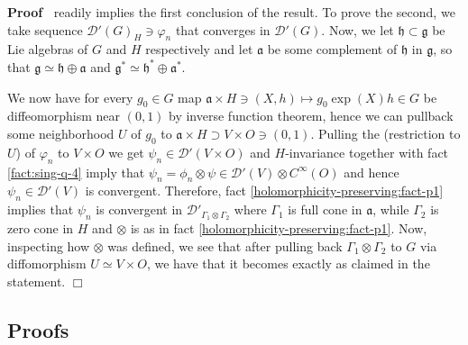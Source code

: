 \documentclass{article}
\newenvironment{proof}{\noindent\textbf{Proof\ }}{\hspace*{\fill}$\Box$\medskip}
\begin{document}
\begin{proof}
  {\cite[thm. 8.3.1]{hormander1983analysis}} readily implies the first
  conclusion of the result. To prove the second, we take sequence
  $\mathcal{D}' (G)_H \ni \varphi_n$ that converges in $\mathcal{D}' (G)$.
  Now, we let $\mathfrak{h} \subset \mathfrak{g}$ be Lie algebras of $G$ and
  $H$ respectively and let $\mathfrak{a}$ be some complement of $\mathfrak{h}$
  in $\mathfrak{g}$, so that $\mathfrak{g} \simeq \mathfrak{h} \oplus
  \mathfrak{a}$ and $\mathfrak{g}^{\ast} \simeq \mathfrak{h}^{\ast} \oplus
  \mathfrak{a}^{\ast}$.
  
  We now have for every $g_0 \in G$ map $\mathfrak{a} \times H \ni (X, h)
  \mapsto g_0 \exp (X) h \in G$ be diffeomorphism near $(0, 1)$ by inverse
  function theorem, hence we can pullback some neighborhood $U$ of $g_0$ to
  $\mathfrak{a} \times H \supset V \times O \ni (0, 1)$. Pulling the
  (restriction to $U$) of $\varphi_n$ to $V \times O$ we get $\psi_n \in
  \mathcal{D}' (V \times O)$ and $H$-invariance together with fact
  \ref{fact:sing-q-4} imply that $\psi_n = \phi_n \otimes \psi \in
  \mathcal{D}' (V) \otimes C^{\infty} (O)$ and hence $\psi_n \in \mathcal{D}'
  (V)$ is convergent. Therefore, fact \ref{holomorphicity-preserving:fact-p1}
  implies that $\psi_n$ is convergent in $\mathcal{D}'_{\Gamma_1 \otimes
  \Gamma_2}$ where $\Gamma_1$ is full cone in $\mathfrak{a}$, while $\Gamma_2$
  is zero cone in $H$ and $\otimes$ is as in fact
  \ref{holomorphicity-preserving:fact-p1}. Now, inspecting how $\otimes$ was
  defined, we see that after pulling back $\Gamma_1 \otimes \Gamma_2$ to $G$
  via diffomorphism $U \simeq V \times O$, we have that it becomes exactly as
  claimed in the statement.
\end{proof}

\subsection{Proofs}
\end{document}
